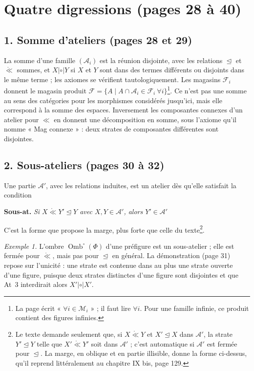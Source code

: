 \documentclass[11pt,a4paper]{article}
\begin{document}
\section*{Quatre digressions (pages 28 à 40)}

\subsection*{1. Somme d'ateliers (pages 28 et 29)}

La somme d'une famille $(\mathcal{A}_{i})$ est la réunion disjointe, avec les
relations $\trianglelefteq$ et $\mathrel{\mathring{\ll}}$ sommes, et $X
\mathrel{|\circ|} Y$ si $X$ et $Y$ sont dans des termes différents ou disjoints
dans le même terme ; les axiomes se vérifient tautologiquement. Les magasins
$\mathcal{F}_{i}$ donnent le magasin produit $\mathcal{F} = \{A \mid A \cap
\mathcal{A}_{i} \in \mathcal{F}_{i}\ \forall i\}$\footnote{La page écrit
« $\forall i \in \mathcal{M}_{i}$ » ; il faut lire $\forall i$. Pour une famille
infinie, ce produit contient des figures infinies.}. Ce n'est pas une somme au
sens des catégories pour les morphismes considérés jusqu'ici, mais elle
correspond à la somme des espaces. Inversement les composantes connexes d'un
atelier pour $\ll$ en donnent une décomposition en somme, sous l'axiome qu'il
nomme « Mag connexe » : deux strates de composantes différentes sont disjointes.

\subsection*{2. Sous-ateliers (pages 30 à 32)}

Une partie $\mathcal{A}'$, avec les relations induites, est un atelier dès
qu'elle satisfait la condition

\textbf{Sous-at.} \emph{Si $X \mathrel{\mathring{\ll}} Y' \trianglelefteq Y$ avec
$X, Y \in \mathcal{A}'$, alors $Y' \in \mathcal{A}'$}

C'est la forme que propose la marge, plus forte que celle du
texte\footnote{Le texte demande seulement que, si $X \mathrel{\mathring{\ll}} Y$
et $X' \trianglelefteq X$ dans $\mathcal{A}'$, la strate $Y' \trianglelefteq Y$
telle que $X' \mathrel{\mathring{\ll}} Y'$ soit dans $\mathcal{A}'$ ; c'est
automatique si $\mathcal{A}'$ est fermée pour $\trianglelefteq$. La marge, en
oblique et en partie illisible, donne la forme ci-dessus, qu'il reprend
littéralement au chapitre IX bis, page 129.}.

\emph{Exemple 1.} L'ombre $\operatorname{Omb}^{\circ}(\Phi)$ d'une préfigure est
un sous-atelier ; elle est fermée pour $\mathrel{\mathring{\ll}}$, mais pas pour
$\trianglelefteq$ en général. La démonstration (page 31) repose sur l'unicité :
une strate est contenue dans au plus une strate ouverte d'une figure, puisque
deux strates distinctes d'une figure sont disjointes et que At~3 interdirait
alors $X' \mathrel{|\circ|} X'$.
\end{document}

